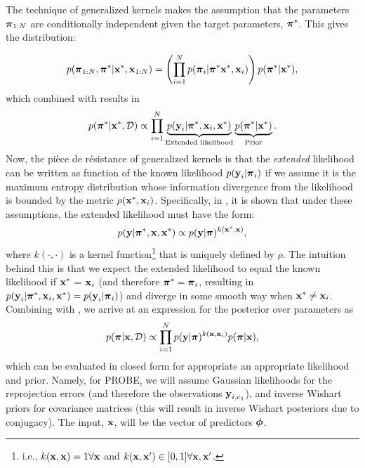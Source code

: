 The technique of generalized kernels makes the assumption that the parameters $\boldsymbol{\mathbf{\pi}}_{1:N}$ are conditionally independent given the target parameters, $\boldsymbol{\mathbf{\pi}}^*$. This gives the distribution:

\begin{equation}
 p(\boldsymbol{\mathbf{\pi}}_{1:N}, \boldsymbol{\mathbf{\pi}}^*| \boldsymbol{\mathbf{x}}^*, \boldsymbol{\mathbf{x}}_{1:N}) = \left( \prod_{i=1}^N  p(\boldsymbol{\mathbf{\pi}}_i | \boldsymbol{\mathbf{\pi}}^* \boldsymbol{\mathbf{x}}^*, \boldsymbol{\mathbf{x}}_i)  \right) p(\boldsymbol{\mathbf{\pi}}^* | \boldsymbol{\mathbf{x}}^*), 
\end{equation}
which combined with  results in
\begin{equation}
\label{eq:probe_extended_likelihood}
p(\boldsymbol{\mathbf{\pi}}^* | \boldsymbol{\mathbf{x}}^*, \mathcal{D}) \propto \prod_{i=1}^N \underbrace{p(\boldsymbol{\mathbf{y}}_i | \boldsymbol{\mathbf{\pi}}^*, \boldsymbol{\mathbf{x}}_i, \boldsymbol{\mathbf{x}}^*)}_{\text{Extended likelihood}} \underbrace{p(\boldsymbol{\mathbf{\pi}}^*|\boldsymbol{\mathbf{x}}^*)}_{\text{Prior}}.
\end{equation}
Now, the pièce de résistance of generalized kernels is that the \textit{extended} likelihood can be written as function of the known likelihood $p(\boldsymbol{\mathbf{y}}_i | \boldsymbol{\mathbf{\pi}}_i)$ if we assume it is the maximum entropy distribution whose information divergence from the likelihood is bounded by the metric $\rho(\boldsymbol{\mathbf{x}}^*, \boldsymbol{\mathbf{x}}_i)$. Specifically, in \cite{Vega-Brown2014-sb}, it is shown that under these assumptions, the extended likelihood must have the form:
\begin{equation}
\label{eq:probe_kernel_likelihood}
p(\boldsymbol{\mathbf{y}} | \boldsymbol{\mathbf{\pi}}^*, \boldsymbol{\mathbf{x}}, \boldsymbol{\mathbf{x}}^*) \propto p(\boldsymbol{\mathbf{y}} | \boldsymbol{\mathbf{\pi}})^{k(\boldsymbol{\mathbf{x}}^*, \boldsymbol{\mathbf{x}})},
\end{equation}
where $k(\cdot, \cdot)$ is a kernel function\footnote{i.e., $k(\boldsymbol{\mathbf{x}}, \boldsymbol{\mathbf{x}}) = 1 \forall \boldsymbol{\mathbf{x}}$ and $k(\boldsymbol{\mathbf{x}}, \boldsymbol{\mathbf{x}}') \in [0,1] \forall \boldsymbol{\mathbf{x}}, \boldsymbol{\mathbf{x}}'$.} that is uniquely defined by $\rho$. The intuition behind this is that we expect the extended likelihood to equal the known likelihood if $\boldsymbol{\mathbf{x}}^*$ = $\boldsymbol{\mathbf{x}}_i$ (and therefore $\boldsymbol{\mathbf{\pi}}^* = \boldsymbol{\mathbf{\pi}}_i$, resulting in $p(\boldsymbol{\mathbf{y}}_i | \boldsymbol{\mathbf{\pi}}^*, \boldsymbol{\mathbf{x}}_i, \boldsymbol{\mathbf{x}}^*) = p(\boldsymbol{\mathbf{y}}_i | \boldsymbol{\mathbf{\pi}}_i)$) and diverge in some smooth way when $\boldsymbol{\mathbf{x}}^* \neq \boldsymbol{\mathbf{x}}_i$. 
Combining  with , we arrive at an expression for the posterior over parameters as 
\begin{equation}
\label{eq:probe_posterior}
p(\boldsymbol{\mathbf{\pi}} | \boldsymbol{\mathbf{x}}, \mathcal{D}) \propto \prod_{i=1}^N p(\boldsymbol{\mathbf{y}} | \boldsymbol{\mathbf{\pi}})^{k(\boldsymbol{\mathbf{x}}, \boldsymbol{\mathbf{x}}_i)} p(\boldsymbol{\mathbf{\pi}} |\boldsymbol{\mathbf{x}}),
\end{equation}
which can be evaluated in closed form for appropriate an appropriate likelihood and prior. Namely, for PROBE, we will assume Gaussian likelihoods for the reprojection errors (and therefore the observations $\boldsymbol{\mathbf{y}}_{i, c_1}$), and inverse Wishart priors for covariance matrices (this will result in inverse Wishart posteriors due to conjugacy). The input, $\boldsymbol{\mathbf{x}}$, will be the vector of predictors $\boldsymbol{\mathbf{\phi}}$.





